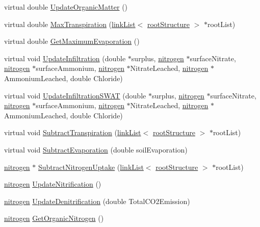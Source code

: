 \begin{DoxyCompactItemize}
virtual double \hyperlink{classsoil_profile_a9928340939c7a139c0e708be2e7d4ca0}{UpdateOrganicMatter} ()
\item 
virtual double \hyperlink{classsoil_profile_a92e15c837353821cbb06c51bb3fd542b}{MaxTranspiration} (\hyperlink{classlink_list}{linkList}$<$ \hyperlink{structroot_structure}{rootStructure} $>$ $\ast$rootList)
\item 
virtual double \hyperlink{classsoil_profile_acfcd258f5c2c0914b13a39d6772e0f5c}{GetMaximumEvaporation} ()
\item 
virtual void \hyperlink{classsoil_profile_a2338366aa1f67cfeefb60ed5be15d65a}{UpdateInfiltration} (double $\ast$surplus, \hyperlink{classnitrogen}{nitrogen} $\ast$surfaceNitrate, \hyperlink{classnitrogen}{nitrogen} $\ast$surfaceAmmonium, \hyperlink{classnitrogen}{nitrogen} $\ast$NitrateLeached, \hyperlink{classnitrogen}{nitrogen} $\ast$AmmoniumLeached, double Chloride)
\item 
virtual void \hyperlink{classsoil_profile_a942247912493da600aafecfa845d2d9c}{UpdateInfiltrationSWAT} (double $\ast$surplus, \hyperlink{classnitrogen}{nitrogen} $\ast$surfaceNitrate, \hyperlink{classnitrogen}{nitrogen} $\ast$surfaceAmmonium, \hyperlink{classnitrogen}{nitrogen} $\ast$NitrateLeached, \hyperlink{classnitrogen}{nitrogen} $\ast$AmmoniumLeached, double Chloride)
\item 
virtual void \hyperlink{classsoil_profile_a276eab1d6e61326093e214a89a9af7db}{SubtractTranspiration} (\hyperlink{classlink_list}{linkList}$<$ \hyperlink{structroot_structure}{rootStructure} $>$ $\ast$rootList)
\item 
virtual void \hyperlink{classsoil_profile_a4edb42ee540e88473200024afd61b232}{SubtractEvaporation} (double soilEvaporation)
\item 
\hyperlink{classnitrogen}{nitrogen} $\ast$ \hyperlink{classsoil_profile_af357c8e8608de267646daf715ca1a125}{SubtractNitrogenUptake} (\hyperlink{classlink_list}{linkList}$<$ \hyperlink{structroot_structure}{rootStructure} $>$ $\ast$rootList)
\item 
\hyperlink{classnitrogen}{nitrogen} \hyperlink{classsoil_profile_a4a0d204ede21c28dc81b117813781ee1}{UpdateNitrification} ()
\item 
\hyperlink{classnitrogen}{nitrogen} \hyperlink{classsoil_profile_abd4b5dd658a93bc311fcd9a1233eaa1f}{UpdateDenitrification} (double TotalCO2Emission)
\item 
\hyperlink{classnitrogen}{nitrogen} \hyperlink{classsoil_profile_aee00c88c701f2ef848b9c96a3013e294}{GetOrganicNitrogen} ()
\item 

\end{DoxyCompactItemize}
